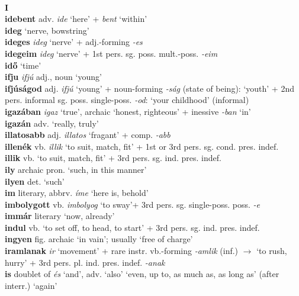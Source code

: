\documentclass[11pt]{article}
\begin{document}
\ \\
\noindent \textbf{\large I} \\
\textbf{idebent} adv. \emph{ide} `here' + \emph{bent} `within' \\
\textbf{ideg} `nerve, bowstring' \\
\textbf{ideges} \emph{ideg} `nerve' + adj.\hyp{}forming \emph{-es} \\
\textbf{idegeim} \emph{ideg} `nerve' + 1st
pers. sg. poss. mult.\hyp{}poss. \emph{-eim} \\
\textbf{idő} `time' \\
\textbf{ifju} \emph{ifjú} adj., noun `young' \\
\textbf{ifjúságod} adj. \emph{ifjú} `young' + noun\hyp{}forming \emph{-ság}
(state of being): `youth' + 2nd pers. informal
sg. poss. single\hyp{}poss. \emph{-od}: `your childhood' (informal) \\
\textbf{igazában} \emph{igaz} `true', archaic `honest, righteous' +
inessive \emph{-ban} `in' \\
\textbf{igazán} adv. `really, truly' \\
\textbf{illatosabb} adj. \emph{illatos} `fragant' +
comp. \emph{-abb} \\
\textbf{illenék} vb. \emph{illik} `to suit, match, fit' + 1st or 3rd pers. sg. cond. pres. indef. \\
\textbf{illik} vb. `to suit, match, fit' + 3rd
pers. sg. ind. pres. indef. \\
\textbf{ily} archaic pron. `such, in this manner' \\
\textbf{ilyen} det. `such' \\
\textbf{im} literary, abbrv. \emph{íme} `here is, behold' \\
\textbf{imbolygott} vb. \emph{imbolyog} `to sway'+ 3rd
pers. sg. single\hyp{}poss. poss. \emph{-e} \\
\textbf{immár} literary `now, already' \\
\textbf{indul} vb. `to set off, to head, to start' + 3rd
pers. sg. ind. pres. indef. \\
\textbf{ingyen} fig. archaic `in vain'; usually `free of charge' \\
\textbf{iramlanak} \emph{ir} `movement' + rare
instr. vb.-forming \emph{-amlik} (inf.) $\rightarrow$ `to rush, hurry'
+ 3rd pers. pl. ind. pres. indef. \emph{-anak} \\
\textbf{is} doublet of \emph{és} `and',
adv. `also' \textbar\textbar{} `even, up to, as much as, as long
as' \textbar\textbar{} (after interr.) `again' \textbar\textbar{}
\end{document}
